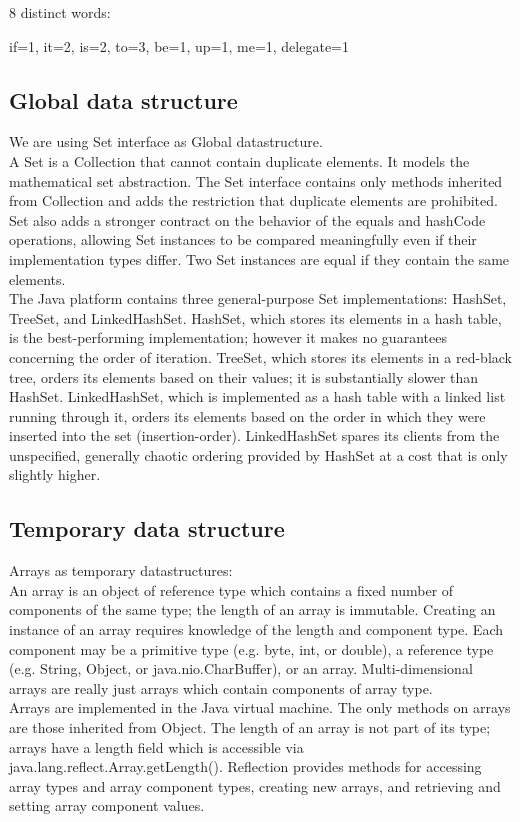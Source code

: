 \documentclass[oneside,a4paper,12pt]{report}
\begin{document}
8 distinct words: {if=1, it=2, is=2, to=3, be=1, up=1, me=1, delegate=1


\subsection{Global data structure}
We are using Set interface as Global datastructure.\\
	A Set is a Collection that cannot contain duplicate elements. It models the mathematical set abstraction. The Set interface contains only methods inherited from Collection and adds the restriction that duplicate elements are prohibited. Set also adds a stronger contract on the behavior of the equals and hashCode operations, allowing Set instances to be compared meaningfully even if their implementation types differ. Two Set instances are equal if they contain the same elements.\\
The Java platform contains three general-purpose Set implementations: HashSet, TreeSet, and LinkedHashSet. HashSet, which stores its elements in a hash table, is the best-performing implementation; however it makes no guarantees concerning the order of iteration. TreeSet, which stores its elements in a red-black tree, orders its elements based on their values; it is substantially slower than HashSet. LinkedHashSet, which is implemented as a hash table with a linked list running through it, orders its elements based on the order in which they were inserted into the set (insertion-order). LinkedHashSet spares its clients from the unspecified, generally chaotic ordering provided by HashSet at a cost that is only slightly higher.


\subsection{Temporary data structure}
Arrays as temporary datastructures: \\
An array is an object of reference type which contains a fixed number of components of the same type; the length of an array is immutable. Creating an instance of an array requires knowledge of the length and component type. Each component may be a primitive type (e.g. byte, int, or double), a reference type (e.g. String, Object, or java.nio.CharBuffer), or an array. Multi-dimensional arrays are really just arrays which contain components of array type. \\
Arrays are implemented in the Java virtual machine. The only methods on arrays are those inherited from Object. The length of an array is not part of its type; arrays have a length field which is accessible via java.lang.reflect.Array.getLength().
Reflection provides methods for accessing array types and array component types, creating new arrays, and retrieving and setting array component values.


}
\end{document}
